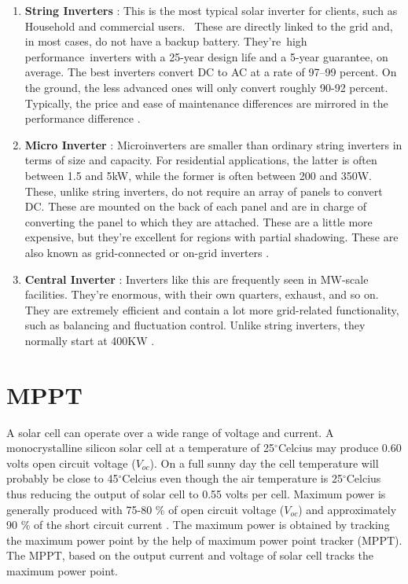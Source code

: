 \documentclass[a4paper,12pt]{iitmdiss}
\begin{document}
\begin{enumerate}
    \item \textbf{String Inverters} : 
    This is the most typical solar inverter for clients, such as Household and commercial users.  These are directly linked to the grid and, in most cases, do not have a backup battery. They're high performance inverters with a 25-year design life and a 5-year guarantee, on average. The best inverters convert DC to AC at a rate of 97–99 percent. On the ground, the less advanced ones will only convert roughly 90-92 percent. Typically, the price and ease of maintenance differences are mirrored in the performance difference \textcolor{blue}{\cite{oorjanblog_2018}}.
    \item \textbf{Micro Inverter} : Microinverters are smaller than ordinary string inverters in terms of size and capacity. For residential applications, the latter is often between 1.5 and 5kW, while the former is often between 200 and 350W. These, unlike string inverters, do not require an array of panels to convert DC. These are mounted on the back of each panel and are in charge of converting the panel to which they are attached. These are a little more expensive, but they're excellent for regions with partial shadowing. These are also known as grid-connected or on-grid inverters \textcolor{blue}{\cite{oorjanblog_2018}}.
    \item \textbf{Central Inverter} : Inverters like this are frequently seen in MW-scale facilities. They're enormous, with their own quarters, exhaust, and so on. They are extremely efficient and contain a lot more grid-related functionality, such as balancing and fluctuation control. Unlike string inverters, they normally start at 400KW \textcolor{blue}{\cite{oorjanblog_2018}}.
\end{enumerate}

\section{MPPT}
A solar cell can operate over a wide range of voltage and current. A monocrystalline silicon solar cell at a temperature of 25$^\circ$Celcius may produce 0.60 volts open circuit voltage ($V_{oc}$). On a full sunny day the cell temperature will probably be close to 45$^\circ$Celcius even though the air temperature is 25$^\circ$Celcius thus reducing the output of solar cell to 0.55 volts per cell. Maximum power is generally produced with 75-80 \% of open circuit voltage ($V_{oc}$) and approximately 90 \% of the short circuit current \textcolor{blue}{\cite{kamil2010grid}}. The maximum power is obtained by tracking the maximum power point by the help of maximum power point tracker (MPPT). The MPPT, based on the output current and voltage of solar cell tracks the maximum power point.    
\end{document}
